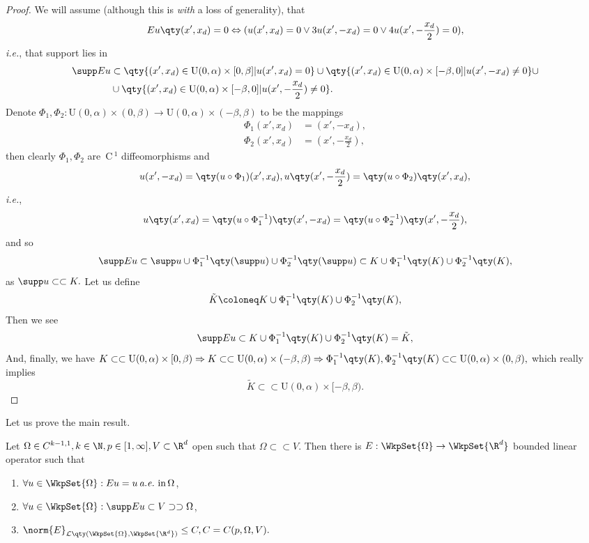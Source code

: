 \begin{proof}
	We will assume (although this is \textit{with} a loss of generality), that
	\[
		Eu\qty(x', x_d) = 0 \Leftrightarrow (u(x', x_d) = 0 \vee 3u(x',-x_d) = 0 \vee 4u(x', - \frac{x_d}{2})= 0),
	\]
	\textit{i.e.}, that support lies in
	\begin{align*}
		\supp Eu &\subset\qty{(x',x_d) \in \text{U}(0,\alpha) \times [0, \beta] | u(x', x_d) = 0} \cup \qty{(x',x_d) \in \text{U}(0,\alpha) \times [-\beta,0]| u(x', - x_d) \neq 0}\cup \\
			 &\cup \qty{(x',x_d) \in \text{U}(0,\alpha) \times [-\beta,0]| u(x', - \frac{x_d}{2}) \neq 0}.
	\end{align*}
	Denote $\Phi_1, \Phi_2: \text{U}(0,\alpha) \times (0,\beta) \to \text{U}(0,\alpha) \times (-\beta,\beta)$ to be the mappings
	\begin{align*}
		\Phi_1 (x',x_d) &= (x', -x_d),\\
		\Phi_2 (x',x_d) &= (x', - \frac{x_d}{2}),
	\end{align*}
	then clearly $\Phi_1, \Phi_2$ are $\, \text{C} \,^1$ diffeomorphisms and
	\[
		u(x',-x_d) = \qty(u \circ \Phi_1)(x',x_d), u\qty(x', - \frac{x_d}{2}) = \qty(u \circ \Phi_2)\qty(x',x_d),
	\]
	\textit{i.e.},
	\[
		u\qty(x',x_d) = \qty(u \circ \Phi_1^{-1})\qty(x', -x_d) = \qty(u \circ \Phi_2^{-1})\qty(x',-\frac{x_d}{2}),
	\]
	and so
	\[
		\supp Eu \subset \supp u \cup \Phi_1^{-1}\qty(\supp u) \cup \Phi_2^{-1}\qty(\supp u) \subset K \cup \Phi_1^{-1}\qty(K) \cup \Phi_2^{-1}\qty(K),
	\]
	as $\supp u \subset \subset K.$ Let us define
	\[
		\tilde{K} \coloneq K \cup \Phi_1^{-1}\qty(K) \cup \Phi_2^{-1}\qty(K),
	\]
	Then we see
	\[
		\supp Eu \subset K \cup \Phi_1^{-1}\qty(K) \cup \Phi_2^{-1}\qty(K) = \tilde{K},
	\]
	And, finally, we have $K \subset \subset \text{U}(0,\alpha) \times [0,\beta) \Rightarrow K \subset \subset \text{U}(0,\alpha) \times (-\beta,\beta) \Rightarrow \Phi_1^{-1}\qty(K), \Phi_2^{-1}\qty(K)\subset \subset \text{U}(0,\alpha)\times (0,\beta),$ which really implies
	\[
		\tilde{K} \subset \subset \text{U}(0,\alpha) \times [-\beta, \beta).
	\]
\end{proof}

Let us prove the main result.

\begin{theorem}
	Let $\Omega \in C^{k-1,1}, k \in \N, p \in [1,\infty], V \subset \R^d$ open such that $\Omega \subset \subset V.$ Then there is $E: \WkpSet{\Omega} \to \WkpSet{\R^d}$ bounded linear operator such that
	\begin{enumerate}
		\item $ \forall u \in \WkpSet{\Omega}: Eu=u \, \text{\textit{a.e.}} \,\, \text{in} \, \Omega$,
		\item $ \forall u \in \WkpSet{\Omega}: \supp Eu \subset V \supset \supset \Omega$,
		\item $\norm{E}_{\mathcal{L}\qty(\WkpSet{\Omega},\WkpSet{\R^{d}})} \leq C, C=C(p,\Omega,V).$
	\end{enumerate}
\end{theorem}

